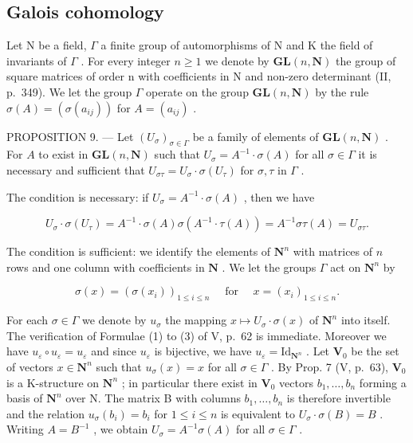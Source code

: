 \subsection{Galois cohomology}

Let N be a field, \(\Gamma\) a finite group of automorphisms of N and K the field of invariants of \(\Gamma\) . For every integer \(n \geqslant 1\) we denote by \(\mathbf{GL}(n, \mathbf{N})\) the group of square matrices of order n with coefficients in N and non-zero determinant (II, p.~349). We let the group \(\Gamma\) operate on the group \(\mathbf{GL}(n, \mathbf{N})\) by the rule \(\sigma(A) = (\sigma(a_{ij}))\) for \(A = (a_{ij})\) .

PROPOSITION 9. --- Let \((U_{\sigma})_{\sigma \in \Gamma}\) be a family of elements of \(\mathbf{GL}(n, \mathbf{N})\) . For \(A\) to exist in \(\mathbf{GL}(n, \mathbf{N})\) such that \(U_{\sigma} = A^{-1} \cdot \sigma(A)\) for all \(\sigma \in \Gamma\) it is necessary and sufficient that \(U_{\sigma\tau} = U_{\sigma} \cdot \sigma(U_{\tau})\) for \(\sigma, \tau\) in \(\Gamma\) .

The condition is necessary: if \(U_{\sigma} = A^{-1} \cdot \sigma(A)\) , then we have

\[
U _ {\sigma} \cdot \sigma (U _ {\tau}) = A ^ {- 1} \cdot \sigma (A) \sigma (A ^ {- 1} \cdot \tau (A)) = A ^ {- 1} \sigma \tau (A) = U _ {\sigma \tau}.
\]

The condition is sufficient: we identify the elements of \(\mathbf{N}^n\) with matrices of \(n\) rows and one column with coefficients in \(\mathbf{N}\) . We let the groups \(\Gamma\) act on \(\mathbf{N}^n\) by

\[
\sigma (x) = \left(\sigma \left(x _ {i}\right)\right) _ {1 \leqslant i \leqslant n} \quad \text { for } \quad x = \left(x _ {i}\right) _ {1 \leqslant i \leqslant n}.
\]

For each \(\sigma \in \Gamma\) we denote by \(u_{\sigma}\) the mapping \(x \mapsto U_{\sigma} \cdot \sigma(x)\) of \(\mathbf{N}^n\) into itself. The verification of Formulae (1) to (3) of V, p.~62 is immediate. Moreover we have \(u_{\varepsilon} \circ u_{\varepsilon} = u_{\varepsilon}\) and since \(u_{\varepsilon}\) is bijective, we have \(u_{\varepsilon} = \mathrm{Id}_{\mathbf{N}^n}\) . Let \(\mathbf{V}_0\) be the set of vectors \(x \in \mathbf{N}^n\) such that \(u_{\sigma}(x) = x\) for all \(\sigma \in \Gamma\) . By Prop. 7 (V, p.~63), \(\mathbf{V}_0\) is a K-structure on \(\mathbf{N}^n\) ; in particular there exist in \(\mathbf{V}_0\) vectors \(b_1, \ldots, b_n\) forming a basis of \(\mathbf{N}^n\) over N. The matrix B with columns \(b_1, \ldots, b_n\) is therefore invertible and the relation \(u_{\sigma}(b_i) = b_i\) for \(1 \leqslant i \leqslant n\) is equivalent to \(U_{\sigma} \cdot \sigma(B) = B\) . Writing \(A = B^{-1}\) , we obtain \(U_{\sigma} = A^{-1}\sigma(A)\) for all \(\sigma \in \Gamma\) .

